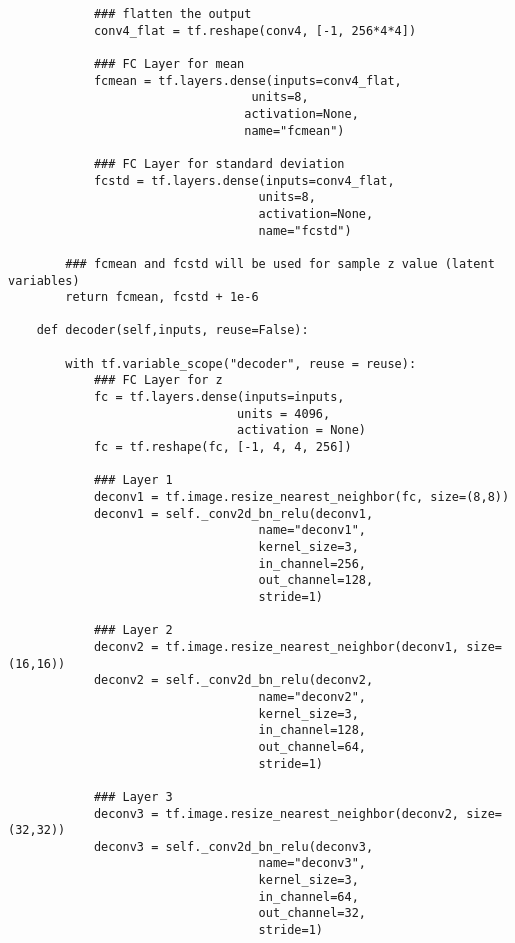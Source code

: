 \begin{footnotesize}
\begin{lstlisting}
            ### flatten the output
            conv4_flat = tf.reshape(conv4, [-1, 256*4*4])

            ### FC Layer for mean
            fcmean = tf.layers.dense(inputs=conv4_flat,
                                  units=8,
                                 activation=None,
                                 name="fcmean")

            ### FC Layer for standard deviation
            fcstd = tf.layers.dense(inputs=conv4_flat,
                                   units=8,
                                   activation=None,
                                   name="fcstd")
        
        ### fcmean and fcstd will be used for sample z value (latent variables)
        return fcmean, fcstd + 1e-6
        
    def decoder(self,inputs, reuse=False):
        
        with tf.variable_scope("decoder", reuse = reuse):
            ### FC Layer for z
            fc = tf.layers.dense(inputs=inputs,
                                units = 4096,
                                activation = None)
            fc = tf.reshape(fc, [-1, 4, 4, 256])

            ### Layer 1
            deconv1 = tf.image.resize_nearest_neighbor(fc, size=(8,8))
            deconv1 = self._conv2d_bn_relu(deconv1,
                                   name="deconv1",
                                   kernel_size=3,
                                   in_channel=256,
                                   out_channel=128,
                                   stride=1)

            ### Layer 2
            deconv2 = tf.image.resize_nearest_neighbor(deconv1, size=(16,16))
            deconv2 = self._conv2d_bn_relu(deconv2,
                                   name="deconv2",
                                   kernel_size=3,
                                   in_channel=128,
                                   out_channel=64,
                                   stride=1)

            ### Layer 3
            deconv3 = tf.image.resize_nearest_neighbor(deconv2, size=(32,32))
            deconv3 = self._conv2d_bn_relu(deconv3,
                                   name="deconv3",
                                   kernel_size=3,
                                   in_channel=64,
                                   out_channel=32,
                                   stride=1)  


\end{lstlisting}
\end{footnotesize}
